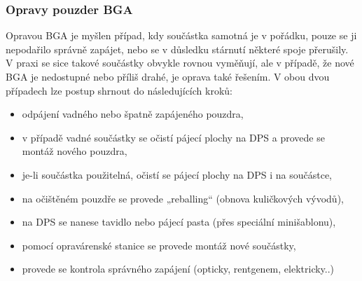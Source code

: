 \subsubsection{Opravy pouzder BGA}
Opravou BGA je myšlen případ, kdy součástka samotná je v pořádku, pouze se ji
nepodařilo správně zapájet, nebo se v důsledku stárnutí některé spoje přerušily. V praxi se sice
takové součástky obvykle rovnou vyměňují, ale v případě, že nové BGA je nedostupné nebo
příliš drahé, je oprava také řešením. V obou dvou případech lze postup shrnout do následujících
kroků:
\begin{itemize}
\item odpájení vadného nebo špatně zapájeného pouzdra,
\item v případě vadné součástky se očistí pájecí plochy na DPS a provede se montáž nového
pouzdra,
\item je-li součástka použitelná, očistí se pájecí plochy na DPS i na součástce,
\item na očištěném pouzdře se provede „reballing“ (obnova kuličkových vývodů),
\item na DPS se nanese tavidlo nebo pájecí pasta (přes speciální minišablonu),
\item pomocí opravárenské stanice se provede montáž nové součástky,
\item provede se kontrola správného zapájení (opticky, rentgenem, elektricky..)
\end{itemize}

























